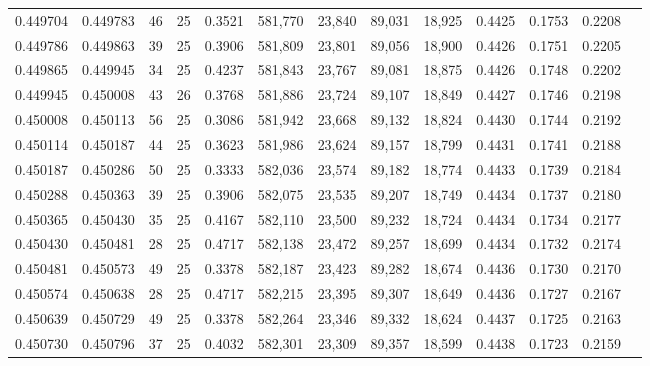 \begin{tabular}{rrrrrrrrrrrrr}
0.449704 & 0.449783 &    46 &  25 &                                     0.3521 & 581,770 &  23,840 &  89,031 &  18,925 & 0.4425 & 0.1753 & 0.2208 \\
0.449786 & 0.449863 &    39 &  25 &                                     0.3906 & 581,809 &  23,801 &  89,056 &  18,900 & 0.4426 & 0.1751 & 0.2205 \\
0.449865 & 0.449945 &    34 &  25 &                                     0.4237 & 581,843 &  23,767 &  89,081 &  18,875 & 0.4426 & 0.1748 & 0.2202 \\
0.449945 & 0.450008 &    43 &  26 &                                     0.3768 & 581,886 &  23,724 &  89,107 &  18,849 & 0.4427 & 0.1746 & 0.2198 \\
0.450008 & 0.450113 &    56 &  25 &                                     0.3086 & 581,942 &  23,668 &  89,132 &  18,824 & 0.4430 & 0.1744 & 0.2192 \\
0.450114 & 0.450187 &    44 &  25 &                                     0.3623 & 581,986 &  23,624 &  89,157 &  18,799 & 0.4431 & 0.1741 & 0.2188 \\
0.450187 & 0.450286 &    50 &  25 &                                     0.3333 & 582,036 &  23,574 &  89,182 &  18,774 & 0.4433 & 0.1739 & 0.2184 \\
0.450288 & 0.450363 &    39 &  25 &                                     0.3906 & 582,075 &  23,535 &  89,207 &  18,749 & 0.4434 & 0.1737 & 0.2180 \\
0.450365 & 0.450430 &    35 &  25 &                                     0.4167 & 582,110 &  23,500 &  89,232 &  18,724 & 0.4434 & 0.1734 & 0.2177 \\
0.450430 & 0.450481 &    28 &  25 &                                     0.4717 & 582,138 &  23,472 &  89,257 &  18,699 & 0.4434 & 0.1732 & 0.2174 \\
0.450481 & 0.450573 &    49 &  25 &                                     0.3378 & 582,187 &  23,423 &  89,282 &  18,674 & 0.4436 & 0.1730 & 0.2170 \\
0.450574 & 0.450638 &    28 &  25 &                                     0.4717 & 582,215 &  23,395 &  89,307 &  18,649 & 0.4436 & 0.1727 & 0.2167 \\
0.450639 & 0.450729 &    49 &  25 &                                     0.3378 & 582,264 &  23,346 &  89,332 &  18,624 & 0.4437 & 0.1725 & 0.2163 \\
0.450730 & 0.450796 &    37 &  25 &                                     0.4032 & 582,301 &  23,309 &  89,357 &  18,599 & 0.4438 & 0.1723 & 0.2159 \\

\end{tabular}
